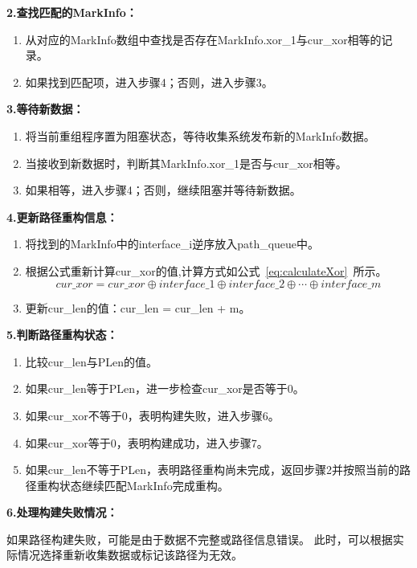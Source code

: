 \textbf{2.查找匹配的MarkInfo：}
\begin{enumerate}[label=\roman*.]
  \item 从对应的MarkInfo数组中查找是否存在MarkInfo.xor\_1与cur\_xor相等的记录。
  \item 如果找到匹配项，进入步骤4；否则，进入步骤3。
\end{enumerate}

\textbf{3.等待新数据：}
\begin{enumerate}[label=\roman*.]
  \item 将当前重组程序置为阻塞状态，等待收集系统发布新的MarkInfo数据。
  \item 当接收到新数据时，判断其MarkInfo.xor\_1是否与cur\_xor相等。
  \item 如果相等，进入步骤4；否则，继续阻塞并等待新数据。
\end{enumerate}

\textbf{4.更新路径重构信息：}
\begin{enumerate}[label=\roman*.]
  \item 将找到的MarkInfo中的interface\_i逆序放入path\_queue中。
  \item 根据公式重新计算cur\_xor的值,计算方式如公式~\ref{eq:calculateXor}~所示。
\begin{equation}
  \label{eq:calculateXor}
  cur\_xor = cur\_xor \oplus interface\_1 \oplus interface\_2 \oplus \cdots \oplus interface\_m
\end{equation}
  \item 更新cur\_len的值：cur\_len = cur\_len + m。
\end{enumerate}

\textbf{5.判断路径重构状态：}
\begin{enumerate}[label=\roman*.]
  \item 比较cur\_len与PLen的值。
  \item 如果cur\_len等于PLen，进一步检查cur\_xor是否等于0。
  \item 如果cur\_xor不等于0，表明构建失败，进入步骤6。
  \item 如果cur\_xor等于0，表明构建成功，进入步骤7。
  \item 如果cur\_len不等于PLen，表明路径重构尚未完成，返回步骤2并按照当前的路径重构状态继续匹配MarkInfo完成重构。
\end{enumerate}


\textbf{6.处理构建失败情况：}\par
如果路径构建失败，可能是由于数据不完整或路径信息错误。
此时，可以根据实际情况选择重新收集数据或标记该路径为无效。\par

